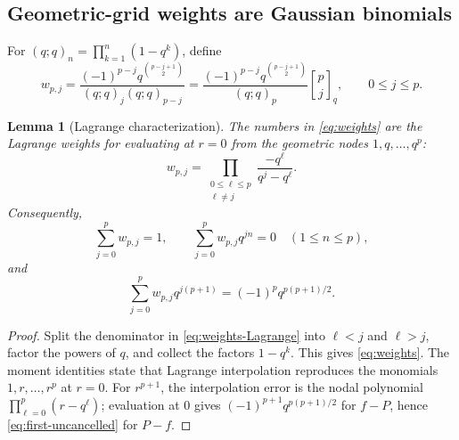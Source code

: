 \documentclass[11pt,oneside]{article}
\numberwithin{equation}{section}
\newtheorem{lemma}[theorem]{Lemma}
\theoremstyle{definition}
\theoremstyle{remark}
\newcommand{\qbinom}[3]{\genfrac{[}{]}{0pt}{}{#1}{#2}_{#3}}
\begin{document}
\subsection{Geometric-grid weights are Gaussian binomials}

For $(q;q)_n=\prod_{k=1}^{n}(1-q^k)$, define
\begin{equation}
 w_{p,j}=
 \frac{(-1)^{p-j}q^{\binom{p-j+1}{2}}}
 {(q;q)_j(q;q)_{p-j}}
 =\frac{(-1)^{p-j}q^{\binom{p-j+1}{2}}}{(q;q)_p}
   \qbinom{p}{j}{q},
 \qquad 0\le j\le p.
 \label{eq:weights}
\end{equation}

\begin{lemma}[Lagrange characterization]
\label{lem:weights}
The numbers in \eqref{eq:weights} are the Lagrange weights for evaluating at $r=0$ from the
geometric nodes $1,q,\ldots,q^p$:
\begin{equation}
 w_{p,j}=\prod_{\substack{0\le\ell\le p\\\ell\ne j}}
 \frac{-q^\ell}{q^j-q^\ell}.
 \label{eq:weights-Lagrange}
\end{equation}
Consequently,
\begin{equation}
 \sum_{j=0}^{p}w_{p,j}=1,
 \qquad
 \sum_{j=0}^{p}w_{p,j}q^{jn}=0\quad(1\le n\le p),
 \label{eq:moment-cancel}
\end{equation}
and
\begin{equation}
 \sum_{j=0}^{p}w_{p,j}q^{j(p+1)}
 =(-1)^pq^{p(p+1)/2}.
 \label{eq:first-uncancelled}
\end{equation}
\end{lemma}

\begin{proof}
Split the denominator in \eqref{eq:weights-Lagrange} into $\ell<j$ and $\ell>j$, factor the
powers of $q$, and collect the factors $1-q^k$.  This gives \eqref{eq:weights}.  The moment
identities state that Lagrange interpolation reproduces the monomials $1,r,\ldots,r^p$ at
$r=0$.  For $r^{p+1}$, the interpolation error is the nodal polynomial
$\prod_{\ell=0}^{p}(r-q^\ell)$; evaluation at $0$ gives
$(-1)^{p+1}q^{p(p+1)/2}$ for $f-P$, hence \eqref{eq:first-uncancelled} for $P-f$.
\end{proof}
\end{document}
